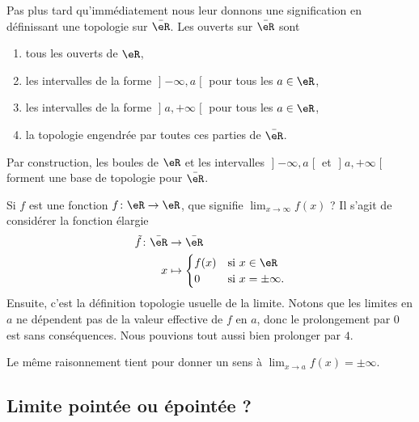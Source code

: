Pas plus tard qu'immédiatement nous leur donnons une signification en définissant une topologie sur \( \bar\eR\). Les ouverts sur \( \bar \eR\) sont
\begin{enumerate}
    \item
        tous les ouverts de \( \eR\),
    \item
        les intervalles de la forme \( \mathopen] -\infty , a \mathclose[\) pour tous les \( a\in \eR\),
    \item
        les intervalles de la forme \( \mathopen] a , +\infty \mathclose[\) pour tous les \( a\in \eR\),
    \item
        la topologie engendrée par toutes ces parties de \( \bar \eR\).
\end{enumerate}

Par construction, les boules de \( \eR\) et les intervalles \( \mathopen] -\infty , a \mathclose[\) et \( \mathopen] a , +\infty \mathclose[\) forment une base de topologie pour \( \bar \eR\).

Si \( f\) est une fonction \( f\colon \eR\to \eR\), que signifie \( \lim_{x\to \infty} f(x)\) ? Il s'agit de considérer la fonction élargie
\begin{equation}
    \begin{aligned}
        \tilde f\colon \bar \eR&\to \bar\eR \\
        x&\mapsto \begin{cases}
            f(x)    &   \text{si } x\in \eR\\
            0    &    \text{si } x=\pm\infty.
        \end{cases}
    \end{aligned}
\end{equation}
Ensuite, c'est la définition topologie usuelle de la limite. Notons que les limites en \( a\) ne dépendent pas de la valeur effective de \( f\) en \( a\), donc le prolongement par \( 0\) est sans conséquences. Nous pouvions tout aussi bien prolonger par \( 4\).

Le même raisonnement tient pour donner un sens à \( \lim_{x\to a} f(x)=\pm \infty\).

\subsection{Limite pointée ou épointée ?}
\label{SUBSECooVHKCooYRFgrb}

